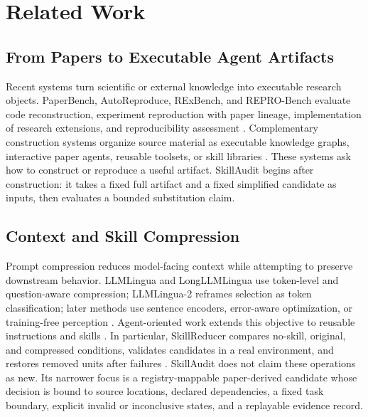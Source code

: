 \section{Related Work}

\subsection{From Papers to Executable Agent Artifacts}

Recent systems turn scientific or external knowledge into executable research objects. PaperBench, AutoReproduce, RExBench, and REPRO-Bench evaluate code reconstruction, experiment reproduction with paper lineage, implementation of research extensions, and reproducibility assessment \cite{starace2025paperbench,zhao2025autoreproduce,edwards2026rexbench,hu2025reprobench}. Complementary construction systems organize source material as executable knowledge graphs, interactive paper agents, reusable toolsets, or skill libraries \cite{luo2026xkg,miao2025paper2agent,ma2025reusabletoolsets,shen2026skillfoundry,pan2026anything2skill}. These systems ask how to construct or reproduce a useful artifact. SkillAudit begins after construction: it takes a fixed full artifact and a fixed simplified candidate as inputs, then evaluates a bounded substitution claim.

\subsection{Context and Skill Compression}

Prompt compression reduces model-facing context while attempting to preserve downstream behavior. LLMLingua and LongLLMLingua use token-level and question-aware compression; LLMLingua-2 reframes selection as token classification; later methods use sentence encoders, error-aware optimization, or training-free perception \cite{jiang2023llmlingua,jiang2024longllmlingua,pan2024llmlingua2,liskavets2025contextcompression,larionov2025promptoptme,tang2025perception}. Agent-oriented work extends this objective to reusable instructions and skills \cite{gao2026skillreducer,xu2026compression}. In particular, SkillReducer compares no-skill, original, and compressed conditions, validates candidates in a real environment, and restores removed units after failures \cite{gao2026skillreducer}. SkillAudit does not claim these operations as new. Its narrower focus is a registry-mappable paper-derived candidate whose decision is bound to source locations, declared dependencies, a fixed task boundary, explicit invalid or inconclusive states, and a replayable evidence record.

